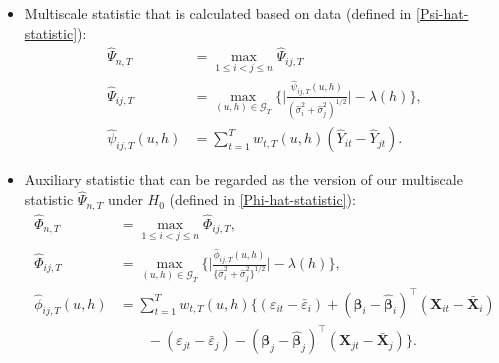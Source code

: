 \documentclass[a4paper,12pt]{article}
\begin{document}
\begin{itemize}
\item Multiscale statistic that is calculated based on data (defined in \eqref{Psi-hat-statistic}):
\begin{align}\label{eq-stat-1}
	\widehat{\Psi}_{n,T} & = \max_{1 \le i < j \le n} \widehat{\Psi}_{ij,T}\nonumber\\
      	\widehat{\Psi}_{ij,T} &= \max_{(u,h) \in \mathcal{G}_T} \Big\{ \Big|\frac{\widehat{\psi}_{ij,T}(u,h)}{(\widehat{\sigma}_i^2 + \widehat{\sigma}_j^2)^{1/2}}\Big| - \lambda(h) \Big\},\\
        \widehat{\psi}_{ij,T}(u,h) &= \sum\limits_{t=1}^T w_{t,T}(u,h)(\widehat{Y}_{it} - \widehat{Y}_{jt}). \nonumber
\end{align}

\item Auxiliary statistic that can be regarded as the version of our multiscale statistic $\widehat{\Psi}_{n, T}$ under $H_0$ (defined in \eqref{Phi-hat-statistic}):
\begin{align}\label{eq-stat-2}
	\widehat{\Phi}_{n,T} &= \max_{1 \le i < j \le n} \widehat{\Phi}_{ij,T},\nonumber \\
	\widehat{\Phi}_{ij,T} &= \max_{(u,h) \in \mathcal{G}_T} \Big\{ \Big| \frac{\widehat{\phi}_{ij,T}(u,h)} {\{ \widehat{\sigma}_i^2 + \widehat{\sigma}_j^2 \}^{1/2}} \Big| - \lambda(h) \Big \}, \\
	\widehat{\phi}_{ij,T}(u,h) &= \sum_{t=1}^T w_{t,T}(u,h) \big\{ (\varepsilon_{it} - \bar{\varepsilon}_i) + (\bm{\beta}_i - \widehat{\bm{\beta}}_i)^\top (\mathbf{X}_{it} - \bar{\mathbf{X}}_{i})  \nonumber \\
	&\quad\quad - (\varepsilon_{jt} - \bar{\varepsilon}_j) -  (\bm{\beta}_j - \widehat{\bm{\beta}}_j)^\top (\mathbf{X}_{jt} - \bar{\mathbf{X}}_{j})\big\}.\nonumber 
\end{align}


\end{itemize}
\end{document}
